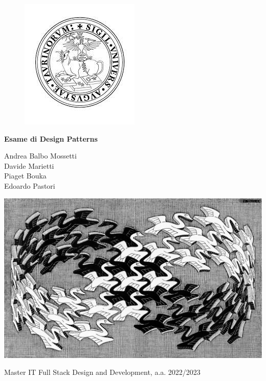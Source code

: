 \documentclass[12pt]{article}
\begin{document}

\begin{figure}
    \centering
    \includegraphics[width=0.2\linewidth]{images/unito_logo.jpg}
\end{figure}

\begin{center}
    \vspace{5ex}
    {\huge \textbf{Esame di Design Patterns}}
    \vspace{5ex}
\end{center}

\begin{center}
    Andrea Balbo Mossetti \\
    Davide Marietti \\
    Piaget Bouka \\
    Edoardo Pastori
\end{center}

\vspace{10ex}

\begin{center}

\includegraphics[scale=2]{design_pattern.jpeg}

\vspace{20ex}

Master IT Full Stack Design and Development, a.a. 2022/2023

\end{center}
\end{document}
